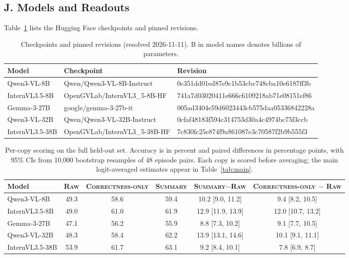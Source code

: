 \documentclass[letterpaper]{article} %
\newcommand{\Raw}{\textsc{Raw}}
\newcommand{\CorrectnessOnly}{\textsc{Correctness-only}}
\newcommand{\Summary}{\textsc{Summary}}
\begin{document}
\subsection{J. Models and Readouts}

Table~\ref{tab:revisions} lists the Hugging Face checkpoints and pinned revisions.

\begin{table}[!t]
  \centering
  \small
  \begin{tabular}{lll}
    \toprule
    Model & Checkpoint & Revision \\
    \midrule
    Qwen3-VL-8B & Qwen/Qwen3-VL-8B-Instruct & 0c351dd01ed87e9c1b53cbc748cba10e6187ff3b \\
    InternVL3.5-8B & OpenGVLab/InternVL3\_5-8B-HF & 741a7d03020411e666c6109218ab71e08151ef86 \\
    Gemma-3-27B & google/gemma-3-27b-it & 005ad3404e59d6023443cb575daa05336842228a \\
    Qwen3-VL-32B & Qwen/Qwen3-VL-32B-Instruct & 0cfaf48183f594c314753d30a4c4974bc75f3ccb \\
    InternVL3.5-38B & OpenGVLab/InternVL3\_5-38B-HF & 7c830fc25e874f9a861087e3c70587f2b9b555f3 \\
    \bottomrule
  \end{tabular}
  \caption{Checkpoints and pinned revisions (resolved 2026-11-11). B in model names denotes billions of parameters.}
  \label{tab:revisions}
\end{table}

\begin{table}[!t]\centering\small
  \setlength{\tabcolsep}{5pt}
  \begin{tabular}{l ccc cc}
    \toprule
    Model & \Raw{} & \CorrectnessOnly{} & \Summary{} & \Summary{}$-$\Raw{} & \CorrectnessOnly{} $-$ \Raw{} \\
    \midrule
    Qwen3-VL-8B & 49.3 & 58.6 & 59.4 & 10.2 [9.0, 11.2] & 9.4 [8.2, 10.5] \\
    InternVL3.5-8B & 49.0 & 61.0 & 61.9 & 12.9 [11.9, 13.9] & 12.0 [10.7, 13.2] \\
    Gemma-3-27B & 47.1 & 56.2 & 55.9 & 8.8 [7.3, 10.2] & 9.1 [7.7, 10.5] \\
    Qwen3-VL-32B & 48.3 & 58.4 & 62.2 & 13.9 [13.1, 14.6] & 10.1 [9.1, 11.1] \\
    InternVL3.5-38B & 53.9 & 61.7 & 63.1 & 9.2 [8.4, 10.1] & 7.8 [6.9, 8.7] \\
    \bottomrule
  \end{tabular}
  \caption{Per-copy scoring on the full held-out set. Accuracy is in percent and paired differences in percentage points, with 95\% CIs from 10{,}000 bootstrap resamples of 48 episode pairs. Each copy is scored before averaging; the main logit-averaged estimates appear in Table~\ref{tab:main}.}
  \label{tab:readout_sensitivity}
\end{table}
\end{document}
